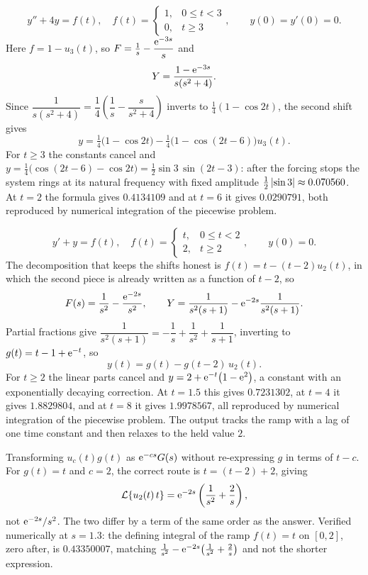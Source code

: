 \begin{worked}
\[y''+4y=f(t),\quad f(t)=\begin{cases}1,&0\le t<3\\0,&t\ge3\end{cases},\qquad y(0)=y'(0)=0.\]
Here $f=1-u_3(t)$, so $F=\tfrac1s-\dfrac{\mathrm{e}^{-3s}}{s}$ and
\[Y=\frac{1-\mathrm{e}^{-3s}}{s(s^{2}+4)}.\]
Since $\dfrac{1}{s(s^{2}+4)}=\dfrac14\left(\dfrac1s-\dfrac{s}{s^{2}+4}\right)$ inverts to $\tfrac14(1-\cos2t)$, the second shift gives
\[y=\tfrac14\bigl(1-\cos2t\bigr)-\tfrac14\bigl(1-\cos(2t-6)\bigr)u_3(t).\]
For $t\ge3$ the constants cancel and $y=\tfrac14\bigl(\cos(2t-6)-\cos2t\bigr)=\tfrac12\sin3\,\sin(2t-3)$: after the forcing stops the system rings at its natural frequency with fixed amplitude $\tfrac12\left\lvert \sin3\right\rvert\approx0.070560$. At $t=2$ the formula gives $0.4134109$ and at $t=6$ it gives $0.0290791$, both reproduced by numerical integration of the piecewise problem.
\end{worked}

\begin{worked}
\[y'+y=f(t),\quad f(t)=\begin{cases}t,&0\le t<2\\2,&t\ge2\end{cases},\qquad y(0)=0.\]
The decomposition that keeps the shifts honest is $f(t)=t-(t-2)u_2(t)$, in which the second piece is already written as a function of $t-2$, so
\[F(s)=\frac1{s^{2}}-\frac{\mathrm{e}^{-2s}}{s^{2}},\qquad Y=\frac{1}{s^{2}(s+1)}-\mathrm{e}^{-2s}\frac{1}{s^{2}(s+1)}.\]
Partial fractions give $\dfrac{1}{s^{2}(s+1)}=-\dfrac1s+\dfrac1{s^{2}}+\dfrac1{s+1}$, inverting to $g(t)=t-1+\mathrm{e}^{-t}$, so
\[y(t)=g(t)-g(t-2)\,u_2(t).\]
For $t\ge2$ the linear parts cancel and $y=2+\mathrm{e}^{-t}\bigl(1-\mathrm{e}^{2}\bigr)$, a constant with an exponentially decaying correction. At $t=1.5$ this gives $0.7231302$, at $t=4$ it gives $1.8829804$, and at $t=8$ it gives $1.9978567$, all reproduced by numerical integration of the piecewise problem. The output tracks the ramp with a lag of one time constant and then relaxes to the held value $2$.
\end{worked}

\begin{trap}
Transforming $u_c(t)g(t)$ as $\mathrm{e}^{-cs}G(s)$ without re-expressing $g$ in terms of $t-c$. For $g(t)=t$ and $c=2$, the correct route is $t=(t-2)+2$, giving
\[\mathcal{L}\{u_2(t)\,t\}=\mathrm{e}^{-2s}\left(\frac1{s^{2}}+\frac2s\right),\]
not $\mathrm{e}^{-2s}/s^{2}$. The two differ by a term of the same order as the answer. Verified numerically at $s=1.3$: the defining integral of the ramp $f(t)=t$ on $[0,2]$, zero after, is $0.43350007$, matching $\tfrac1{s^{2}}-\mathrm{e}^{-2s}\bigl(\tfrac1{s^{2}}+\tfrac2s\bigr)$ and not the shorter expression.
\end{trap}

